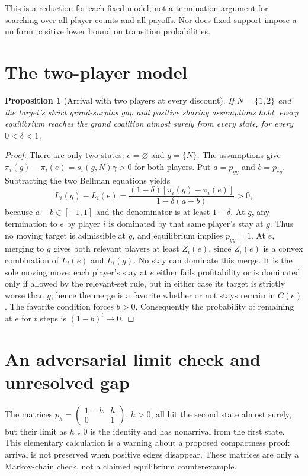 \documentclass[11pt]{article}
\newtheorem{proposition}[theorem]{Proposition}
\theoremstyle{definition}
\begin{document}
This is a reduction for each fixed model, not a termination argument for searching over all player counts and all payoffs. Nor does fixed support impose a uniform positive lower bound on transition probabilities.

\section*{The two-player model}
\begin{proposition}[Arrival with two players at every discount]
If $N=\{1,2\}$ and the target's strict grand-surplus gap and positive sharing assumptions hold, every equilibrium reaches the grand coalition almost surely from every state, for every $0<\delta<1$.
\end{proposition}
\begin{proof}
There are only two states: $e=\varnothing$ and $g=\{N\}$. The assumptions give
$\pi_i(g)-\pi_i(e)=s_i(g,N)\gamma>0$ for both players. Put $a=p_{gg}$ and $b=p_{eg}$. Subtracting the two Bellman equations yields
\[
 L_i(g)-L_i(e)=
 \frac{(1-\delta)[\pi_i(g)-\pi_i(e)]}{1-\delta(a-b)}>0,
\]
because $a-b\in[-1,1]$ and the denominator is at least $1-\delta$.
At $g$, any termination to $e$ by player $i$ is dominated by that same player's stay at $g$. Thus no moving target is admissible at $g$, and equilibrium implies $p_{gg}=1$.
At $e$, merging to $g$ gives both relevant players at least $Z_i(e)$, since $Z_i(e)$ is a convex combination of $L_i(e)$ and $L_i(g)$. No stay can dominate this merge. It is the sole moving move: each player's stay at $e$ either fails profitability or is dominated only if allowed by the relevant-set rule, but in either case its target is strictly worse than $g$; hence the merge is a favorite whether or not stays remain in $C(e)$. The favorite condition forces $b>0$. Consequently the probability of remaining at $e$ for $t$ steps is $(1-b)^t\to0$.
\end{proof}

\section*{An adversarial limit check and unresolved gap}
The matrices $p_h=\left(\begin{smallmatrix}1-h&h\\0&1\end{smallmatrix}\right)$, $h>0$, all hit the second state almost surely, but their limit as $h\downarrow0$ is the identity and has nonarrival from the first state. This elementary calculation is a warning about a proposed compactness proof: arrival is not preserved when positive edges disappear. These matrices are only a Markov-chain check, not a claimed equilibrium counterexample.
\end{document}
